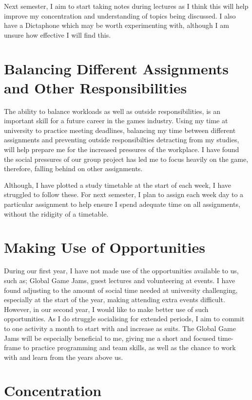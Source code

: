 \documentclass{scrartcl}
\begin{document}
Next semester, I aim to start taking notes during lectures as I think this will help improve my concentration and understanding of topics being discussed. I also have a Dictaphone which may be worth experimenting with, although I am unsure how effective I will find this.

\section{Balancing Different Assignments and Other Responsibilities}

The ability to balance workloads as well as outside responsibilities, is an important skill for a future career in the games industry. Using my time at university to practice meeting deadlines, balancing my time between different assignments and preventing outside responsibilties detracting from my studies, will help prepare me for the increased pressures of the workplace. I have found the social pressures of our group project has led me to focus heavily on the game, therefore, falling behind on other assignments. 

Although, I have plotted a study timetable at the start of each week, I have struggled to follow these. For next semester, I plan to assign each week day to a particular assignment to help ensure I spend adequate time on all assignments, without the ridigity of a timetable.

\section{Making Use of Opportunities}

During our first year, I have not made use of the opportunities available to us, such as; Global Game Jams, guest lectures and volunteering at events. I have found adjusting to the amount of social time needed at university challenging, especially at the start of the year, making attending extra events difficult. However, in our second year, I would like to make better use of such opportunities. As I do struggle socialising for extended periods, I aim to commit to one activity a month to start with and increase as suits. The Global Game Jams will be especially beneficial to me, giving me a short and focused time-frame to practice programming and team skills, as well as the chance to work with and learn from the years above us.


\section{Concentration}
\end{document}
